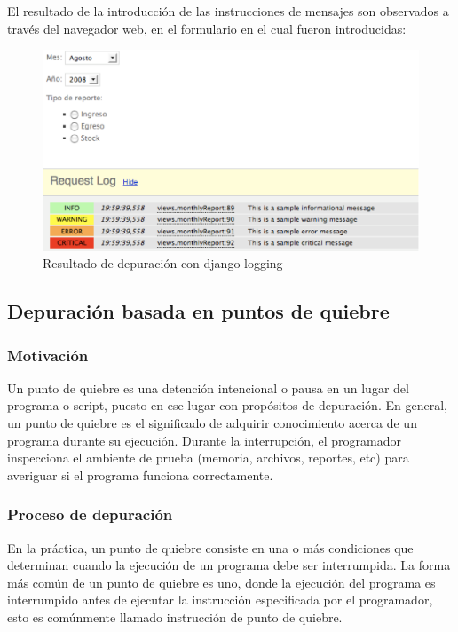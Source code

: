 \documentclass[12pt,legalpaper]{report}
\begin{document}
El resultado de la introducción de las instrucciones de mensajes son observados a través del navegador web, en el formulario en el cual fueron introducidas:

\begin{figure}[hpb]
	\centering
	\includegraphics[scale=0.5]{images/django-logging.eps}
	\caption{Resultado de depuración con django-logging}
\end{figure}
 

		\subsection{Depuración basada en puntos de quiebre}
			\subsubsection{Motivación}

Un punto de quiebre es una detención intencional o pausa en un lugar del programa o script, puesto en ese lugar con propósitos de depuración.  En general, un punto de quiebre es el significado de adquirir conocimiento acerca de un programa durante su ejecución.  Durante la interrupción, el programador inspecciona el ambiente de prueba (memoria, archivos, reportes, etc) para averiguar si el programa funciona correctamente.

			\subsubsection{Proceso de depuración}

En la práctica, un punto de quiebre consiste en una o más condiciones que determinan cuando la ejecución de un programa debe ser interrumpida.  La forma más común de un punto de quiebre es uno, donde la ejecución del programa es interrumpido antes de ejecutar la instrucción especificada por el programador, esto es comúnmente llamado instrucción de punto de quiebre.
\end{document}
